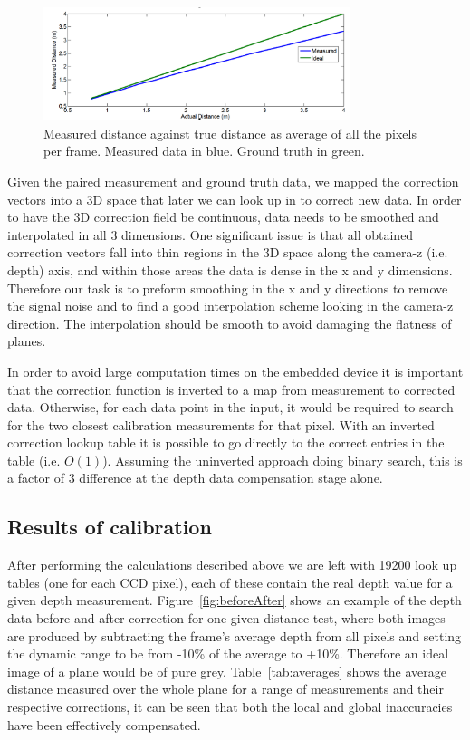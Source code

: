 \documentclass[]{article}
\begin{document}
{\begin{figure}[htb]
	\begin{center}
		\includegraphics[width = 0.8\textwidth]{avDist2}
	\end{center}
	\caption{Measured distance against true distance as average of all the pixels per frame. Measured data in blue. Ground truth in green.}
	\label{fig:avDist2}
\end{figure}

Given the paired measurement and ground truth data, we mapped the correction vectors into a 3D space that later we can look up in to correct new data. In order to have the 3D correction field be continuous, data needs to be smoothed and interpolated in all 3 dimensions. One significant issue is that all obtained correction vectors fall into thin regions in the 3D space along the camera-z (i.e. depth) axis, and within those areas the data is dense in the x and y dimensions. Therefore our task is to preform smoothing in the x and y directions to remove the signal noise and to find a good interpolation scheme looking in the camera-z direction. The interpolation should be smooth to avoid damaging the flatness of planes. 

In order to avoid large computation times on the embedded device it is important that the correction function is inverted to a map from measurement to corrected data. Otherwise, for each data point in the input, it would be required to search for the two closest calibration measurements for that pixel. With an inverted correction lookup table it is possible to go directly to the correct entries in the table (i.e. $O(1)$). Assuming the uninverted approach doing binary search, this is a factor of 3 difference at the depth data compensation stage alone. 

\subsection{Results of calibration} %
 \label{sub:results_of_calibration}
 After performing the calculations described above we are left with 19200 look up tables (one for each CCD pixel), each of these contain the real depth value for a given depth measurement. Figure~\ref{fig:beforeAfter} shows an example of the depth data before and after correction for one given distance test, where both images are produced by subtracting the frame's average depth from all pixels and setting the dynamic range to be from -10\% of the average to +10\%. Therefore an ideal image of a plane would be of pure grey. Table~\ref{tab:averages} shows the average distance measured over the whole plane for a range of measurements and their respective corrections, it can be seen that both the local and global inaccuracies have been effectively compensated. 

}
\end{document}
